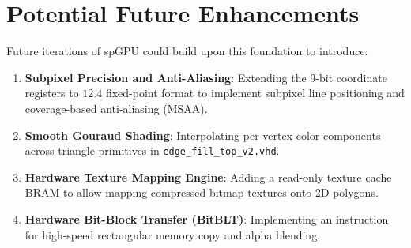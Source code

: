 \section{Potential Future Enhancements}
Future iterations of spGPU could build upon this foundation to introduce:
\begin{enumerate}
    \item \textbf{Subpixel Precision and Anti-Aliasing}: Extending the 9-bit coordinate registers to $12.4$ fixed-point format to implement subpixel line positioning and coverage-based anti-aliasing (MSAA).
    \item \textbf{Smooth Gouraud Shading}: Interpolating per-vertex color components across triangle primitives in \texttt{edge\_fill\_top\_v2.vhd}.
    \item \textbf{Hardware Texture Mapping Engine}: Adding a read-only texture cache BRAM to allow mapping compressed bitmap textures onto 2D polygons.
    \item \textbf{Hardware Bit-Block Transfer (BitBLT)}: Implementing an instruction for high-speed rectangular memory copy and alpha blending.
\end{enumerate}
